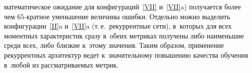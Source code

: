 \begin{multicols}{2}

\noindent
 математическое ожидание для конфигураций~\ref{VII} 
и~\ref{VII}{a}) получается более чем $65$-крат\-ное уменьшение величины 
ошибки. Отдельно можно выделить конфигурации~\ref{II}{a} и~\ref{VII}{a} (т.\,е.\ 
рекуррентные сети), в~которых для всех моментных характеристик сразу в~обеих 
метриках получены либо наименьшие среди всех, либо близкие к~этому значения. 
Таким образом, применение рекуррентных архитектур ведет к~значительному 
повышению качества обучения в~любой из рассматриваемых метрик. 

\begin{table*}[b]\small %
\vspace*{-8pt}
\begin{center}
\label{TabTime}
\vspace*{2ex}


\end{center}
\end{table*}
\end{multicols}
